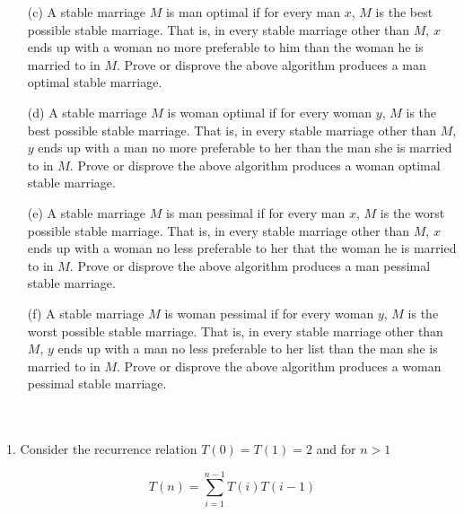 \documentclass[10pt]{article}
\begin{document}
\begin{enumerate}
				\item[(c)]  A stable marriage $M$ is man optimal if for every man $x$, $M$ is the best possible stable marriage.
										That is, in every stable marriage other than $M$, $x$ ends up with a woman no more preferable to
										him than the woman he is married to in $M$.  Prove or disprove the above algorithm produces a
										man optimal stable marriage.
				\item[(d)]  A stable marriage $M$  is woman optimal if for every woman $y$,  $M$  is the best  possible stable
										marriage.   That is,  in every  stable marriage other  than $M$,  $y$  ends  up with a  man no  more
										preferable to her than the man she is married to in $M$.  Prove or disprove the above algorithm
										produces a woman optimal stable marriage.
				\item[(e)]  A stable marriage $M$ is man pessimal if for every man $x$, $M$ is the worst possible stable marriage.
										That is, in every stable marriage other than $M$, $x$ ends up with a woman no less preferable to her
										that the woman he is married to in $M$.  Prove or disprove the above algorithm produces a man
										pessimal stable marriage.
				\item[(f)]  A stable marriage $M$  is woman pessimal if for every woman $y$, $M$  is the worst possible stable
										marriage. That is, in every stable marriage other than $M$, $y$ ends up with a man no less preferable
										to her list than the man she is married to in $M$. Prove or disprove the above algorithm produces
										a woman pessimal stable marriage.
			\end{enumerate}
	\\
	\\
	1. Consider the recurrence relation $T(0) = T(1) = 2$ and for $n > 1$
	
	\[T(n) = \sum\limits_{i=1}^{n-1} T(i)T(i-1) \]
	
\end{document}
